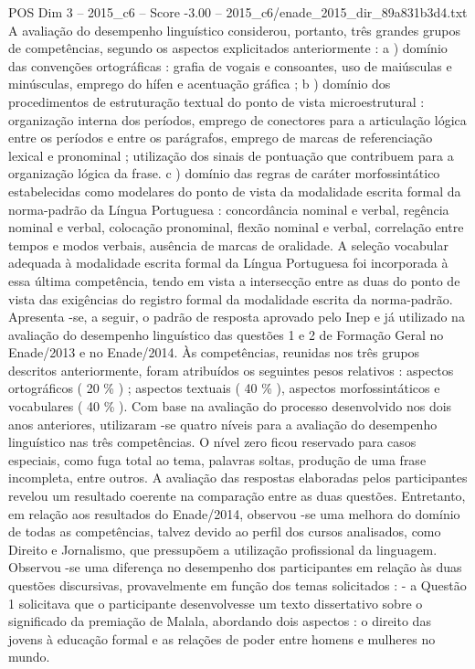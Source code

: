 \begin{textsample}{POS Dim 3 – 2015\_c6 – Score -3.00 – 2015\_c6/enade\_2015\_dir\_89a831b3d4.txt}
A avaliação do desempenho linguístico considerou, portanto, três grandes grupos de competências, segundo os aspectos explicitados anteriormente : a ) domínio das convenções ortográficas : grafia de vogais e consoantes, uso de maiúsculas e minúsculas, emprego do hífen e acentuação gráfica ; b ) domínio dos procedimentos de estruturação textual do ponto de vista microestrutural : organização interna dos períodos, emprego de conectores para a articulação lógica entre os períodos e entre os parágrafos, emprego de marcas de referenciação lexical e pronominal ; utilização dos sinais de pontuação que contribuem para a organização lógica da frase. c ) domínio das regras de caráter morfossintático estabelecidas como modelares do ponto de vista da modalidade escrita formal da norma-padrão da Língua Portuguesa : concordância nominal e verbal, regência nominal e verbal, colocação pronominal, flexão nominal e verbal, correlação entre tempos e modos verbais, ausência de marcas de oralidade.
A seleção vocabular adequada à modalidade escrita formal da Língua Portuguesa foi incorporada à essa última competência, tendo em vista a intersecção entre as duas do ponto de vista das exigências do registro formal da modalidade escrita da norma-padrão.
Apresenta -se, a seguir, o padrão de resposta aprovado pelo Inep e já utilizado na avaliação do desempenho linguístico das questões 1 e 2 de Formação Geral no Enade/2013 e no Enade/2014.
Às competências, reunidas nos três grupos descritos anteriormente, foram atribuídos os seguintes pesos relativos : aspectos ortográficos ( 20 \% ) ; aspectos textuais ( 40 \% ), aspectos morfossintáticos e vocabulares ( 40 \% ).
Com base na avaliação do processo desenvolvido nos dois anos anteriores, utilizaram -se quatro níveis para a avaliação do desempenho linguístico nas três competências.
O nível zero ficou reservado para casos especiais, como fuga total ao tema, palavras soltas, produção de uma frase incompleta, entre outros.
A avaliação das respostas elaboradas pelos participantes revelou um resultado coerente na comparação entre as duas questões.
Entretanto, em relação aos resultados do Enade/2014, observou -se uma melhora do domínio de todas as competências, talvez devido ao perfil dos cursos analisados, como Direito e Jornalismo, que pressupõem a utilização profissional da linguagem.
Observou -se uma diferença no desempenho dos participantes em relação às duas questões discursivas, provavelmente em função dos temas solicitados : - a Questão 1 solicitava que o participante desenvolvesse um texto dissertativo sobre o significado da premiação de Malala, abordando dois aspectos : o direito das jovens à educação formal e as relações de poder entre homens e mulheres no mundo.

\end{textsample}
